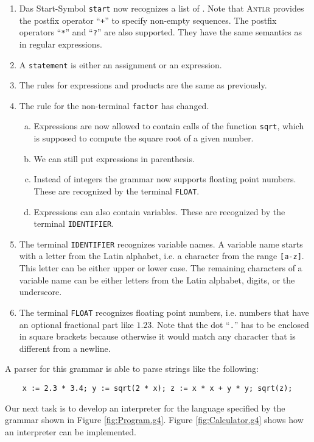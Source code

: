 \begin{enumerate}
\item Das Start-Symbol \texttt{start} now recognizes a list of .
      Note that \textsc{Antlr} provides the postfix operator ``\texttt{+}'' to
      specify non-empty sequences.  The postfix operators ``\texttt{*}'' and ``\texttt{?}'' are also 
      supported.  They have the same semantics as in regular expressions.
\item A \texttt{statement} is either an assignment or an expression. 
\item The rules for expressions and products are the same as previously.
\item The rule for the non-terminal \texttt{factor} has changed.
      \begin{enumerate}[(a)]
      \item Expressions are now allowed to contain calls of the function \texttt{sqrt},
            which is supposed to compute the square root of a given number.
      \item We can still put expressions in parenthesis.
      \item Instead of integers the grammar now supports floating point numbers.
            These are recognized by the terminal \texttt{FLOAT}.
      \item Expressions can also contain variables.  These are recognized by the terminal
            \texttt{IDENTIFIER}.
      \end{enumerate}
\item The terminal \texttt{IDENTIFIER} recognizes variable names.  A variable name starts with 
      a letter from the Latin alphabet, i.e. a character from the range \texttt{[a-z]}.  This letter can be either
      upper or lower case.  The remaining characters of a variable name can be either letters from the Latin
      alphabet, digits, or the underscore.
\item The terminal \texttt{FLOAT} recognizes floating point numbers, i.e. numbers that have an optional
      fractional part like $1.23$.  Note that the dot ``\texttt{.}'' has to be enclosed in square
      brackets because otherwise it would match any character that is different from a newline.  
\end{enumerate}
A parser for this grammar is able to parse strings like the following:
\begin{verbatim}
    x := 2.3 * 3.4; y := sqrt(2 * x); z := x * x + y * y; sqrt(z);
\end{verbatim}
Our next task is to develop an interpreter for the language specified by the grammar shown 
in Figure \ref{fig:Program.g4}.  Figure \ref{fig:Calculator.g4} shows how an interpreter can be implemented.



